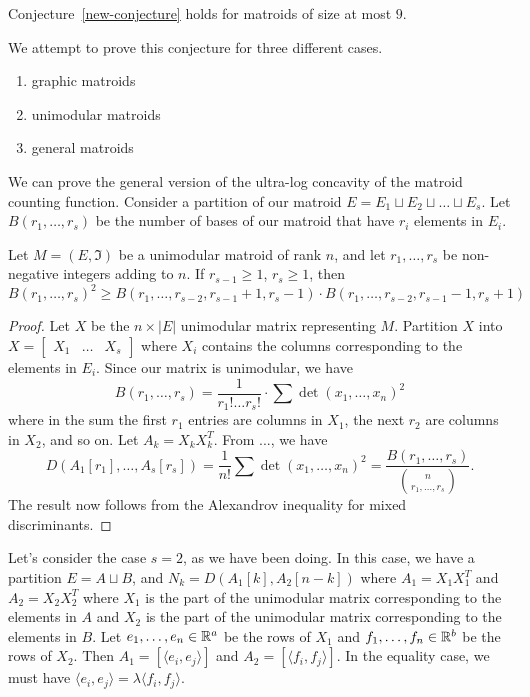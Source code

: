 \documentclass[12pt]{article}
\begin{document}
\begin{thm}
	Conjecture~\ref{new-conjecture} holds for matroids of size at most $9$. 
\end{thm}

We attempt to prove this conjecture for three different cases. 
\begin{enumerate}[label = (\roman*)]
	\item graphic matroids
	\item unimodular matroids
	\item general matroids 
\end{enumerate}

We can prove the general version of the ultra-log concavity of the matroid counting function. Consider a partition of our matroid $E = E_1 \sqcup E_2 \sqcup \ldots \sqcup E_s$. Let $B(r_1, \ldots, r_s)$ be the number of bases of our matroid that have $r_i$ elements in $E_i$. 

\begin{thm}
	Let $M = (E, \mathfrak{I})$ be a unimodular matroid of rank $n$, and let $r_1, \ldots, r_s$ be non-negative integers adding to $n$. If $r_{s-1} \geq 1$, $r_s \geq 1$, then 
	\[
		B(r_1, \ldots, r_s)^2 \geq B(r_1, \ldots, r_{s-2}, r_{s-1} + 1, r_s - 1) \cdot B(r_1, \ldots, r_{s-2}, r_{s-1} - 1, r_{s} + 1)
	\]
\end{thm}

\begin{proof}
	Let $X$ be the $n \times |E|$ unimodular matrix representing $M$. Partition $X$ into $X = \begin{bmatrix} X_1 & \ldots & X_s \end{bmatrix}$ where $X_i$ contains the columns corresponding to the elements in $E_i$. Since our matrix is unimodular, we have 
	\[
		B(r_1, \ldots, r_s) = \frac{1}{r_1! \ldots r_s!} \cdot \sum \det (x_1, \ldots, x_n)^2
	\]
	where in the sum the first $r_1$ entries are columns in $X_1$, the next $r_2$ are columns in $X_2$, and so on. Let $A_k = X_k X_k^T$. From ..., we have 
	\[
		D(A_1 [r_1], \ldots, A_s [r_s]) = \frac{1}{n!} \sum \det (x_1, \ldots, x_n)^2 = \frac{B(r_1, \ldots, r_s)}{\binom{n}{r_1, \ldots, r_s}}. 
	\] 
	The result now follows from the Alexandrov inequality for mixed discriminants. 
\end{proof}

Let's consider the case $s = 2$, as we have been doing. In this case, we have a partition $E = A \sqcup B$, and $N_k = D(A_1[k], A_2[n-k])$ where $A_1 = X_1 X_1^T$ and $A_2 = X_2 X_2^T$ where $X_1$ is the part of the unimodular matrix corresponding to the elements in $A$ and $X_2$ is the part of the unimodular matrix corresponding to the elements in $B$. Let $e_1, \ldots, e_n \in \mathbb{R}^a$ be the rows of $X_1$ and $f_1, \ldots, f_n \in \mathbb{R}^b$ be the rows of $X_2$. Then $A_1 = [\langle e_i, e_j \rangle ]$ and $A_2 = [\langle f_i, f_j \rangle]$. In the equality case, we must have $\langle e_i, e_j \rangle = \lambda \langle f_i, f_j \rangle$. 
\end{document}
